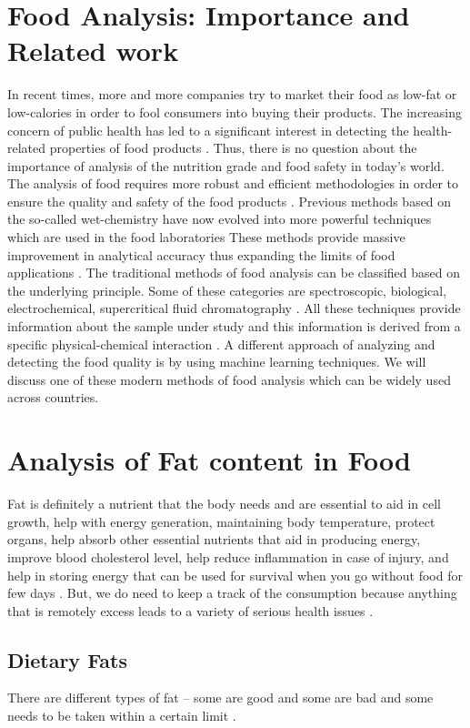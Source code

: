 \documentclass[sigconf]{acmart}
\begin{document}
\section{Food Analysis: Importance and Related work}
In recent times, more and more companies try to market their food as low-fat or low-calories in order to fool consumers into buying their products. The increasing concern of public health has led to a significant interest in detecting the health-related properties of food products  \cite{cifuentes2012food}. Thus, there is no question about the importance of analysis of the nutrition grade and food safety in today's world. The analysis of food requires more robust and efficient methodologies in order to ensure the quality and safety of the food products \cite{cifuentes2012food}. Previous methods based on the so-called wet-chemistry have now evolved into more powerful techniques which are used in the food laboratories These methods provide massive improvement in analytical accuracy thus expanding the limits of food applications \cite{cifuentes2012food}. The traditional methods of food analysis can be classified based on the underlying principle. Some of these categories are spectroscopic, biological, electrochemical, supercritical fluid chromatography \cite{cifuentes2012food}. All these techniques provide information about the sample under study and this information is derived from a specific physical-chemical interaction \cite{cifuentes2012food}. A different approach of analyzing and detecting the food quality is by using machine learning techniques. We will discuss one of these modern methods of food analysis which can be widely used across countries.


\section{Analysis of Fat content in Food}
Fat is definitely a nutrient that the body needs and are essential to aid in cell growth, help with energy generation, maintaining body temperature, protect organs, help absorb other essential nutrients that aid in producing energy, improve blood cholesterol level, help reduce inflammation in case of injury, and help in storing energy that can be used for survival when you go without food for few days \cite{www-health}. But, we do need to keep a track of the consumption because anything that is remotely excess leads to a variety of serious health issues \cite{www-health}.  

\subsection{Dietary Fats}
There are different types of fat – some are good and some are bad and some needs to be taken within a certain limit \cite{www-health}. 
\end{document}
